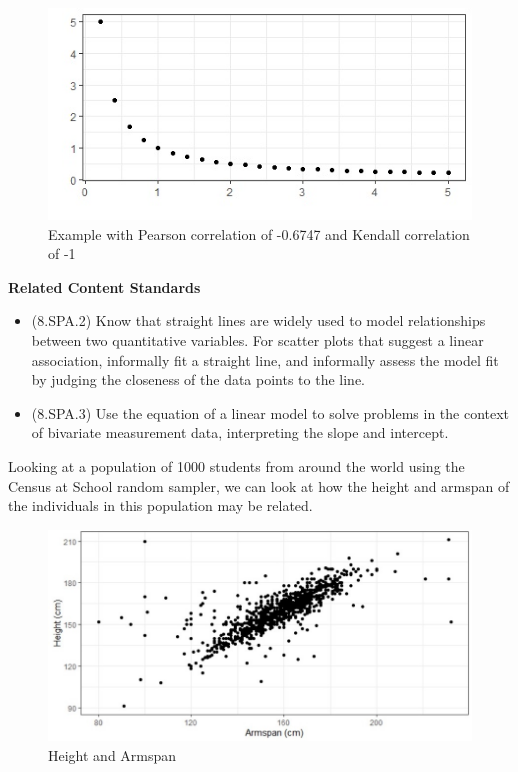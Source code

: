 \documentclass[
]{book}
\providecommand{\tightlist}{%
  \setlength{\itemsep}{0pt}\setlength{\parskip}{0pt}}
\newenvironment{standards}{}{}
\theoremstyle{definition}
\theoremstyle{definition}
\theoremstyle{definition}
\theoremstyle{definition}
\theoremstyle{remark}
\begin{document}
\begin{figure}

{\centering \includegraphics[width=0.8\linewidth]{images/correl_example2} 

}

\caption{Example with Pearson correlation of -0.6747 and Kendall correlation of -1}\label{fig:unnamed-chunk-202}
\end{figure}

\begin{standards}

\begin{center}
\textbf{Related Content Standards}

\end{center}

\begin{itemize}
\tightlist
\item
  (8.SPA.2) Know that straight lines are widely used to model relationships between two quantitative variables. For scatter plots that suggest a linear association, informally fit a straight line, and informally assess the model fit by judging the closeness of the data points to the line.
\item
  (8.SPA.3) Use the equation of a linear model to solve problems in the context of bivariate measurement data, interpreting the slope and intercept.
\end{itemize}

\end{standards}

Looking at a population of 1000 students from around the world using the Census at School random sampler, we can look at how the height and armspan of the individuals in this population may be related.

\begin{figure}

{\centering \includegraphics[width=0.8\linewidth]{images/Armspan_Height} 

}

\caption{Height and Armspan}\label{fig:unnamed-chunk-203}
\end{figure}
\end{document}
